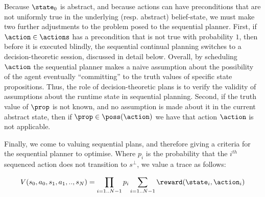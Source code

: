 Because $\state_0$ is abstract, and because actions can have
preconditions that are not uniformly true in the underlying
(resp. abstract) belief-state, we must make two further adjustments to
the problem posed to the sequential planner. First, if
$\action\in\actions$ has a precondition that is not true with
probability $1$, then before it is executed blindly, the sequential
continual planning switches to a decision-theoretic session, discussed in
detail below. Overall, by scheduling $\action$ the sequential planner
makes a naive assumption about the possibility of the agent eventually
``committing'' to the truth values of specific state
propositions. Thus, the role of decision-theoretic plans is to verify
the validity of assumptions about the runtime state in sequential
planning. Second, if the truth value of $\prop$ is not known, and no
assumption is made about it in the current abstract state, then if
$\prop \in
\poss(\action)$ we have that action $\action$ is not applicable.




Finally, we come to valuing sequential plans, and therefore giving a
criteria for the sequential planner to optimise. Where $p_i$ is the
probability that the $i^{th}$ sequenced action does not transition to
$s^\bot$, we value a trace as follows:

\begin{equation}\label{eq:tracevalue}
V(s_0, a_0, s_1, a_1,.., s_N) =  \prod_{i=1..N-1} p_i \sum_{i=1..N-1} \reward(\state_i, \action_i)
\end{equation}

